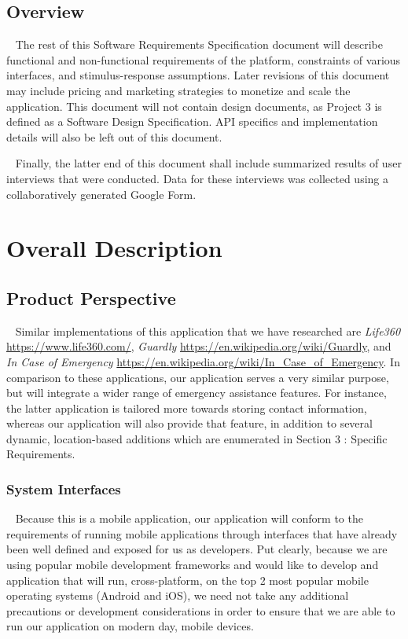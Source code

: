 \documentclass{scrreprt}
\begin{document}
\section{Overview}
\par ~ The rest of this Software Requirements Specification document will describe functional and non-functional requirements of the platform, constraints of various interfaces, and stimulus-response assumptions. Later revisions of this document may include pricing and marketing strategies to monetize and scale the application. This document will not contain design documents, as Project 3 is defined as a Software Design Specification. API specifics and implementation details will also be left out of this document. 

\par ~ Finally, the latter end of this document shall include summarized results of user interviews that were conducted. Data for these interviews was collected using a collaboratively generated Google Form.


\chapter{Overall Description}


\section{Product Perspective}
\par ~ Similar implementations of this application that we have researched are \textit{Life360} \url{https://www.life360.com/}, \textit{Guardly} \url{https://en.wikipedia.org/wiki/Guardly}, and \textit{In Case of Emergency} \url{https://en.wikipedia.org/wiki/In_Case_of_Emergency}. In comparison to these applications, our application serves a very similar purpose, but will integrate a wider range of emergency assistance features. For instance, the latter application is tailored more towards storing contact information, whereas our application will also provide that feature, in addition to several dynamic, location-based additions which are enumerated in Section 3 : Specific Requirements.


\subsection{System Interfaces}
\par ~ Because this is a mobile application, our application will conform to the requirements of running mobile applications through interfaces that have already been well defined and exposed for us as developers. Put clearly, because we are using popular mobile development frameworks and would like to develop and application that will run, cross-platform, on the top 2 most popular mobile operating systems (Android and iOS), we need not take any additional precautions or development considerations in order to ensure that we are able to run our application on modern day, mobile devices.
\end{document}
